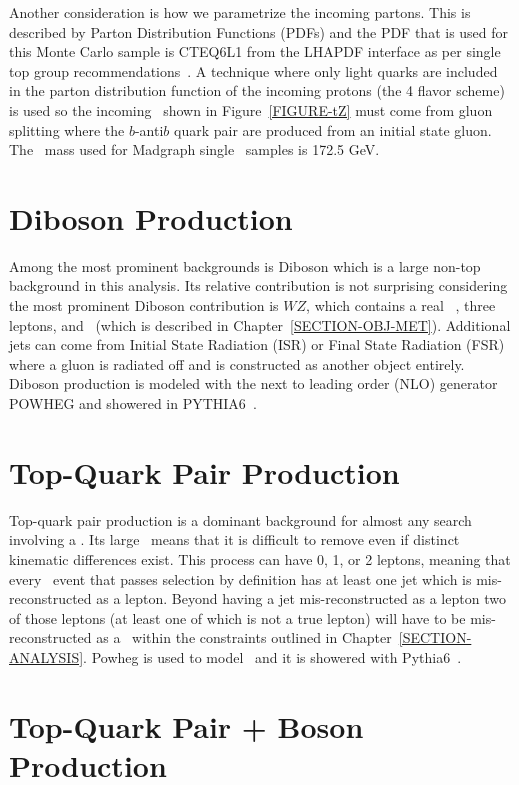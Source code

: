 Another consideration is how we parametrize the incoming partons. This is described by Parton Distribution Functions (PDFs) and the PDF that is used for this Monte Carlo sample is CTEQ6L1 from the LHAPDF interface as per single top group recommendations~\cite{Nadolsky:2008zw,cteq6l,springerlink:10}. A technique where only light quarks are included in the parton distribution function of the incoming protons (the 4 flavor scheme) is used so the incoming \ab~shown in Figure~\ref{FIGURE-tZ} must come from gluon splitting where the $b$-anti$b$ quark pair are produced from an initial state gluon. The \athyph~mass used for Madgraph single \at~samples is 172.5 GeV.


\section{Diboson Production}
\label{SECTION-MC-BG-WZ}

Among the most prominent backgrounds is Diboson which is a large non-top background in this analysis. Its relative contribution is not surprising considering the most prominent Diboson contribution is $WZ$, which contains a real \az~, three leptons, and \met~(which is described in Chapter~\ref{SECTION-OBJ-MET}). Additional jets can come from Initial State Radiation (ISR) or Final State Radiation (FSR) where a gluon is radiated off and is constructed as another object entirely. Diboson production is modeled with the next to leading order (NLO) generator POWHEG and showered in PYTHIA6~\cite{POWHEG,PYTHIA}. 

\section{Top-Quark Pair Production}
\label{SECTION-MC-BG-ttbar}

Top-quark pair production is a dominant background for almost any search involving a \at. Its large \xs~means that it is difficult to remove even if distinct kinematic differences exist. This process can have 0, 1, or 2 leptons, meaning that every \TTB~event that passes selection by definition has at least one jet which is mis-reconstructed as a lepton. Beyond having a jet mis-reconstructed as a lepton two of those leptons (at least one of which is not a true lepton) will have to be mis-reconstructed as a \az~within the constraints outlined in Chapter~\ref{SECTION-ANALYSIS}. Powheg is used to model \TTB~and it is showered with Pythia6~\cite{POWHEG,PYTHIA}. 

\section{Top-Quark Pair + Boson Production}
\label{SECTION-MC-BG-ttbar+X}

